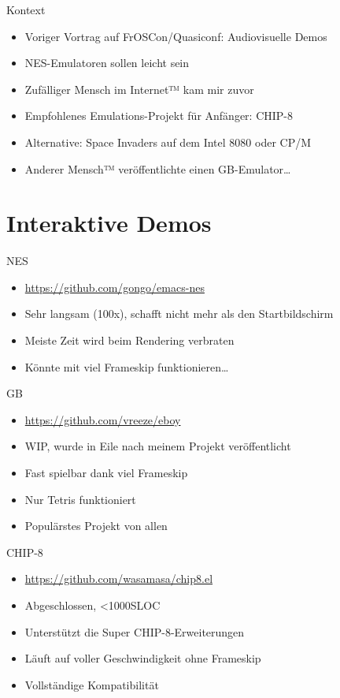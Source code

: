 \documentclass[presentation]{beamer}
\begin{document}
\begin{frame}[label={sec:org41b3054}]{Kontext}
\begin{itemize}
\item Voriger Vortrag auf FrOSCon/Quasiconf: Audiovisuelle Demos
\item NES-Emulatoren sollen leicht sein
\item Zufälliger Mensch im Internet™ kam mir zuvor
\item Empfohlenes Emulations-Projekt für Anfänger: CHIP-8
\item Alternative: Space Invaders auf dem Intel 8080 oder CP/M
\item Anderer Mensch™ veröffentlichte einen GB-Emulator\ldots{}
\end{itemize}
\end{frame}

\section{Interaktive Demos}
\label{sec:orgfed5086}

\begin{frame}[label={sec:orgd88bc5c}]{NES}
\begin{itemize}
\item \url{https://github.com/gongo/emacs-nes}
\item Sehr langsam (100x), schafft nicht mehr als den Startbildschirm
\item Meiste Zeit wird beim Rendering verbraten
\item Könnte mit viel Frameskip funktionieren\ldots{}
\end{itemize}
\end{frame}

\begin{frame}[label={sec:org30f84d7}]{GB}
\begin{itemize}
\item \url{https://github.com/vreeze/eboy}
\item WIP, wurde in Eile nach meinem Projekt veröffentlicht
\item Fast spielbar dank viel Frameskip
\item Nur Tetris funktioniert
\item Populärstes Projekt von allen
\end{itemize}
\end{frame}

\begin{frame}[label={sec:org17bc2ef}]{CHIP-8}
\begin{itemize}
\item \url{https://github.com/wasamasa/chip8.el}
\item Abgeschlossen, <1000SLOC
\item Unterstützt die Super CHIP-8-Erweiterungen
\item Läuft auf voller Geschwindigkeit ohne Frameskip
\item Vollständige Kompatibilität
\end{itemize}
\end{frame}
\end{document}
